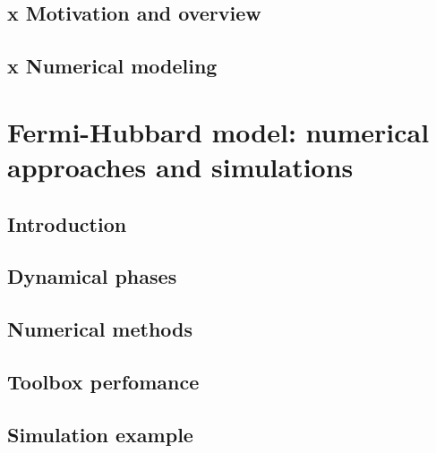 \documentclass[twoside]{article}
\begin{document}
\subsection{x Motivation and overview}

\subsection{x Numerical modeling}


\newpage
\section{Fermi-Hubbard model: numerical approaches and simulations} \label{sec:fhmodel}

\subsection{Introduction}

\subsection{Dynamical phases}

\subsection{Numerical methods}

\subsection{Toolbox perfomance}

\subsection{Simulation example}


\newpage
\end{document}
